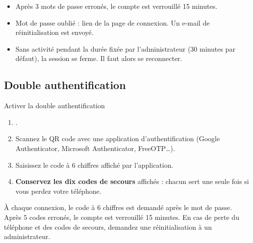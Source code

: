\documentclass[11pt,a4paper]{article}
\begin{document}
\begin{regle}
\begin{itemize}
  \item Après 3 mots de passe erronés, le compte est verrouillé 15 minutes.
  \item Mot de passe oublié : lien  de la page de
    connexion. Un e-mail de réinitialisation est envoyé.
  \item Sans activité pendant la durée fixée par l'administrateur (30 minutes
    par défaut), la session se ferme. Il faut alors se reconnecter.
\end{itemize}
\end{regle}

\subsection{Double authentification}\label{sec:2fa}
\begin{procedure}{Activer la double authentification}
\begin{enumerate}
  \item {}.
  \item Scannez le QR code avec une application d'authentification
    (Google Authenticator, Microsoft Authenticator, FreeOTP…).
  \item Saisissez le code à 6 chiffres affiché par l'application.
  \item \textbf{Conservez les dix codes de secours} affichés : chacun sert
    une seule fois si vous perdez votre téléphone.
\end{enumerate}
\end{procedure}
À chaque connexion, le code à 6 chiffres est demandé après le mot de passe.
Après 5 codes erronés, le compte est verrouillé 15 minutes. En cas de perte du
téléphone et des codes de secours, demandez une réinitialisation à un
administrateur.
\end{document}

